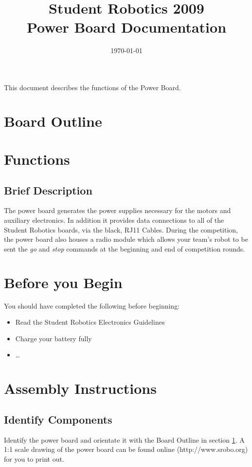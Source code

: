 \documentclass[a4paper, 12pt]{article}
\title {Student Robotics 2009\\ Power Board Documentation}
\date{\today}
\begin{document}
\maketitle

\noindent This document describes the functions of the Power Board. 

\section{Board Outline}
\label{sec:outline}

\section{Functions}
\subsection{Brief Description}
The power board generates the power supplies necessary for the motors and auxiliary electronics. In addition it provides data connections to all of the Student Robotics boards, via the black, RJ11 Cables. During the competition, the power board also houses a radio module which allows your team's robot to be sent the \textit{go} and \textit{stop} commands at the beginning and end of competition rounds.

\section{Before you Begin}
You should have completed the following before beginning:
\begin{itemize}
\item	Read the Student Robotics Electronics Guidelines
\item	Charge your battery fully
\item	\ldots
\end{itemize}

\section{Assembly Instructions}
\subsection{Identify Components}
Identify the power board and orientate it with the Board Outline in section \ref{sec:outline}. A 1:1 scale drawing of the power board can be found online (http://www.srobo.org) for you to print out.
\end{document}
